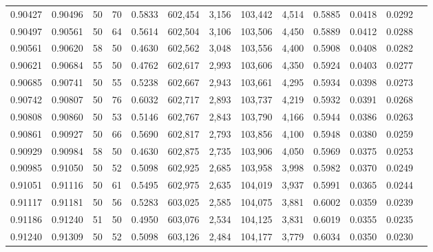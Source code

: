 \begin{tabular}{rrrrrrrrrrrrr}
0.90427 & 0.90496 &    50 &  70 &                                     0.5833 & 602,454 &   3,156 & 103,442 &   4,514 & 0.5885 & 0.0418 & 0.0292 \\
0.90497 & 0.90561 &    50 &  64 &                                     0.5614 & 602,504 &   3,106 & 103,506 &   4,450 & 0.5889 & 0.0412 & 0.0288 \\
0.90561 & 0.90620 &    58 &  50 &                                     0.4630 & 602,562 &   3,048 & 103,556 &   4,400 & 0.5908 & 0.0408 & 0.0282 \\
0.90621 & 0.90684 &    55 &  50 &                                     0.4762 & 602,617 &   2,993 & 103,606 &   4,350 & 0.5924 & 0.0403 & 0.0277 \\
0.90685 & 0.90741 &    50 &  55 &                                     0.5238 & 602,667 &   2,943 & 103,661 &   4,295 & 0.5934 & 0.0398 & 0.0273 \\
0.90742 & 0.90807 &    50 &  76 &                                     0.6032 & 602,717 &   2,893 & 103,737 &   4,219 & 0.5932 & 0.0391 & 0.0268 \\
0.90808 & 0.90860 &    50 &  53 &                                     0.5146 & 602,767 &   2,843 & 103,790 &   4,166 & 0.5944 & 0.0386 & 0.0263 \\
0.90861 & 0.90927 &    50 &  66 &                                     0.5690 & 602,817 &   2,793 & 103,856 &   4,100 & 0.5948 & 0.0380 & 0.0259 \\
0.90929 & 0.90984 &    58 &  50 &                                     0.4630 & 602,875 &   2,735 & 103,906 &   4,050 & 0.5969 & 0.0375 & 0.0253 \\
0.90985 & 0.91050 &    50 &  52 &                                     0.5098 & 602,925 &   2,685 & 103,958 &   3,998 & 0.5982 & 0.0370 & 0.0249 \\
0.91051 & 0.91116 &    50 &  61 &                                     0.5495 & 602,975 &   2,635 & 104,019 &   3,937 & 0.5991 & 0.0365 & 0.0244 \\
0.91117 & 0.91181 &    50 &  56 &                                     0.5283 & 603,025 &   2,585 & 104,075 &   3,881 & 0.6002 & 0.0359 & 0.0239 \\
0.91186 & 0.91240 &    51 &  50 &                                     0.4950 & 603,076 &   2,534 & 104,125 &   3,831 & 0.6019 & 0.0355 & 0.0235 \\
0.91240 & 0.91309 &    50 &  52 &                                     0.5098 & 603,126 &   2,484 & 104,177 &   3,779 & 0.6034 & 0.0350 & 0.0230 \\

\end{tabular}
